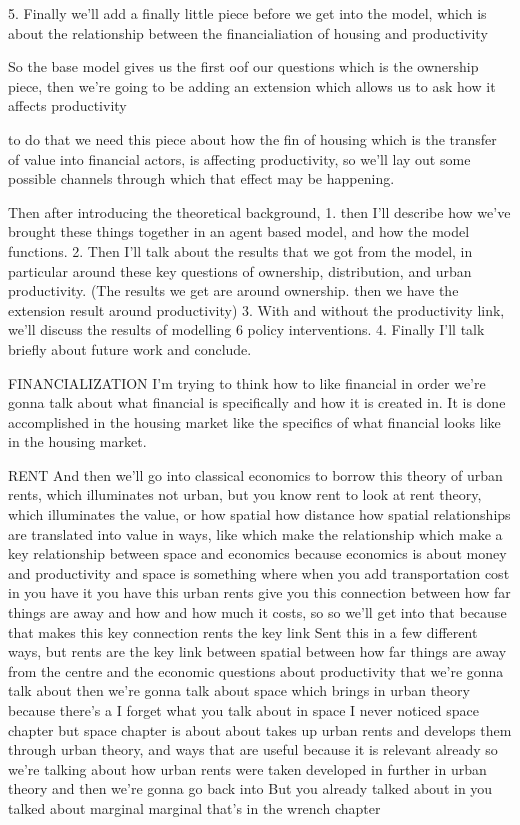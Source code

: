 5. Finally  we'll add a finally little piece before we get  into the model,  which is about the relationship between the financialiation of housing and productivity

So the base model gives us the first oof our questions which is the ownership piece, then we're going to be adding an extension which allows us to ask how it affects productivity

to do that we need this piece about how the fin of housing which is the transfer of value into financial actors, is affecting productivity, so we'll lay out some possible channels through which that effect may be happening.

Then  after introducing the theoretical background, 
1. then I'll describe how we've brought these things together in an agent based model, and how the model functions. 
2. Then I'll talk about the results that we got from the model, in particular around these key questions of ownership, distribution, and urban productivity.  (The results we get  are around ownership. then we have the extension result around productivity) 
3. With and without the productivity link, we'll discuss the results of modelling 6 policy interventions. 
4. Finally I'll talk briefly about future work and conclude. 





FINANCIALIZATION
I’m trying to think how to like financial in order we’re gonna talk about what financial is specifically and how it is created in. It is done accomplished in the housing market like the specifics of what financial looks like in the housing market.

RENT
And then we’ll go into classical economics to borrow this theory of urban rents, which illuminates not urban, but you know rent to look at rent theory, which illuminates the value, or how spatial how distance how spatial relationships are translated into value in ways, like which make the relationship which make a key relationship between space and economics because economics is about money and productivity and space is something where when you add transportation cost in you have it you have this urban rents give you this connection between how far things are away and how and how much it costs, so so we’ll get into that because that makes this key connection rents the key link Sent this in a few different ways, but rents are the key link between spatial between how far things are away from the centre and the economic questions about productivity that we’re gonna talk about then we’re gonna talk about space which brings in urban theory because there’s a I forget what you talk about in space I never noticed space chapter but space chapter is about about takes up urban rents and develops them through urban theory, and ways that are useful because it is relevant already so we’re talking about how urban rents were taken developed in further in urban theory and then we’re gonna go back into But you already talked about in you talked about marginal marginal that’s in the wrench chapter

